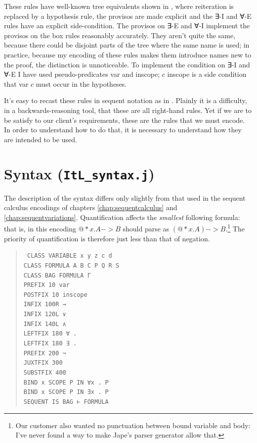 These rules have well-known tree equivalents shown in , where reiteration is replaced by a hypothesis rule, the provisos are made explicit and the ∃-I and ∀-E rules have an explicit side-condition. The provisos on ∃-E and ∀-I implement the provisos on the box rules reasonably accurately. They aren't quite the same, because there could be disjoint parts of the tree where the same name is used; in practice, because my encoding of these rules makes them introduce names new to the proof, the distinction is unnoticeable. To implement the condition on ∃-I and ∀-E I have used pseudo-predicates var and inscope; $c$ inscope is a side condition that var $c$ must occur in the hypotheses.

It's easy to recast these rules in sequent notation as in . Plainly it is a difficulty, in a backwards-reasoning tool, that these are all right-hand rules. Yet if we are to be satisfy to our client's requirements, these are the rules that we must encode. In order to understand how to do that, it is necessary to understand how they are intended to be used.

\section{Syntax (\texttt{ItL\_syntax.j})}

The description of the syntax differs only slightly from that used in the sequent calculus encodings of chapters \ref{chap:sequentcalculus} and \ref{chap:sequentvariations}. Quantification affects the \textit{smallest} following formula: that is, in this encoding $@*x.A->B$ should parse as $(@*x.A) ->B$.\footnote{Our customer also wanted no punctuation between bound variable and body: I've never found a way to make Jape's parser generator allow that.} The priority of quantification is therefore just less than that of negation.
\begin{quote}\tt\small
CLASS VARIABLE x y z c d \\
CLASS FORMULA A B C P Q R S \\
CLASS BAG FORMULA Γ \\

PREFIX  10      var \\
POSTFIX 10      inscope \\

INFIX       100R    → \\
INFIX       120L        ∨ \\
INFIX       140L        ∧ \\

LEFTFIX 180     ∀ . \\
LEFTFIX 180     ∃ . \\

PREFIX  200     ¬ \\
JUXTFIX 300 \\
SUBSTFIX    400  \\

BIND x SCOPE P IN ∀x . P \\
BIND x SCOPE P IN ∃x . P \\

SEQUENT IS BAG ⊢ FORMULA
\end{quote}

